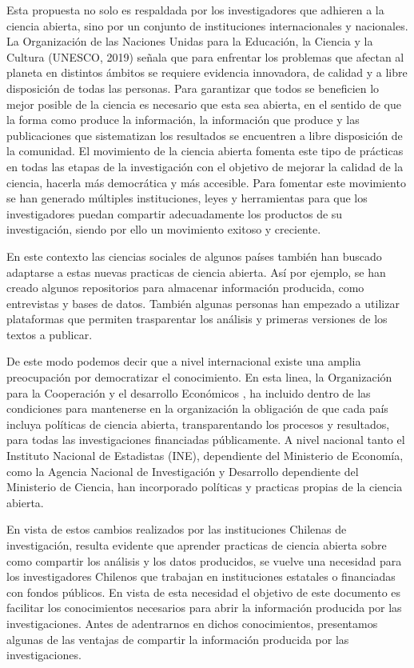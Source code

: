 \documentclass[
  14pt,
]{book}
\begin{document}
Esta propuesta no solo es respaldada por los investigadores que adhieren a la ciencia abierta, sino por un conjunto de instituciones internacionales y nacionales. La Organización de las Naciones Unidas para la Educación, la Ciencia y la Cultura (UNESCO, 2019) señala que para enfrentar los problemas que afectan al planeta en distintos ámbitos se requiere evidencia innovadora, de calidad y a libre disposición de todas las personas. Para garantizar que todos se beneficien lo mejor posible de la ciencia es necesario que esta sea abierta, en el sentido de que la forma como produce la información, la información que produce y las publicaciones que sistematizan los resultados se encuentren a libre disposición de la comunidad. El movimiento de la ciencia abierta fomenta este tipo de prácticas en todas las etapas de la investigación con el objetivo de mejorar la calidad de la ciencia, hacerla más democrática y más accesible. Para fomentar este movimiento se han generado múltiples instituciones, leyes y herramientas para que los investigadores puedan compartir adecuadamente los productos de su investigación, siendo por ello un movimiento exitoso y creciente.

En este contexto las ciencias sociales de algunos países también han buscado adaptarse a estas nuevas practicas de ciencia abierta. Así por ejemplo, se han creado algunos repositorios para almacenar información producida, como entrevistas y bases de datos. También algunas personas han empezado a utilizar plataformas que permiten trasparentar los análisis y primeras versiones de los textos a publicar.

De este modo podemos decir que a nivel internacional existe una amplia preocupación por democratizar el conocimiento. En esta linea, la Organización para la Cooperación y el desarrollo Económicos \citep{ocde_Open_2020}, ha incluido dentro de las condiciones para mantenerse en la organización la obligación de que cada país incluya políticas de ciencia abierta, transparentando los procesos y resultados, para todas las investigaciones financiadas públicamente. A nivel nacional tanto el Instituto Nacional de Estadistas (INE), dependiente del Ministerio de Economía, como la Agencia Nacional de Investigación y Desarrollo \citep{anid_Con_2020} dependiente del Ministerio de Ciencia, han incorporado políticas y practicas propias de la ciencia abierta.

En vista de estos cambios realizados por las instituciones Chilenas de investigación, resulta evidente que aprender practicas de ciencia abierta sobre como compartir los análisis y los datos producidos, se vuelve una necesidad para los investigadores Chilenos que trabajan en instituciones estatales o financiadas con fondos públicos. En vista de esta necesidad el objetivo de este documento es facilitar los conocimientos necesarios para abrir la información producida por las investigaciones. Antes de adentrarnos en dichos conocimientos, presentamos algunas de las ventajas de compartir la información producida por las investigaciones.
\end{document}
